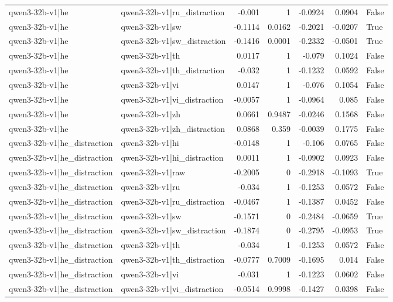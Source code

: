 \begin{table}
\begin{tabular}{l l r r r r l}
qwen3-32b-v1|he & qwen3-32b-v1|ru_distraction & -0.001 & 1 & -0.0924 & 0.0904 & False \\
qwen3-32b-v1|he & qwen3-32b-v1|sw & -0.1114 & 0.0162 & -0.2021 & -0.0207 & True \\
qwen3-32b-v1|he & qwen3-32b-v1|sw_distraction & -0.1416 & 0.0001 & -0.2332 & -0.0501 & True \\
qwen3-32b-v1|he & qwen3-32b-v1|th & 0.0117 & 1 & -0.079 & 0.1024 & False \\
qwen3-32b-v1|he & qwen3-32b-v1|th_distraction & -0.032 & 1 & -0.1232 & 0.0592 & False \\
qwen3-32b-v1|he & qwen3-32b-v1|vi & 0.0147 & 1 & -0.076 & 0.1054 & False \\
qwen3-32b-v1|he & qwen3-32b-v1|vi_distraction & -0.0057 & 1 & -0.0964 & 0.085 & False \\
qwen3-32b-v1|he & qwen3-32b-v1|zh & 0.0661 & 0.9487 & -0.0246 & 0.1568 & False \\
qwen3-32b-v1|he & qwen3-32b-v1|zh_distraction & 0.0868 & 0.359 & -0.0039 & 0.1775 & False \\
qwen3-32b-v1|he_distraction & qwen3-32b-v1|hi & -0.0148 & 1 & -0.106 & 0.0765 & False \\
qwen3-32b-v1|he_distraction & qwen3-32b-v1|hi_distraction & 0.0011 & 1 & -0.0902 & 0.0923 & False \\
qwen3-32b-v1|he_distraction & qwen3-32b-v1|raw & -0.2005 & 0 & -0.2918 & -0.1093 & True \\
qwen3-32b-v1|he_distraction & qwen3-32b-v1|ru & -0.034 & 1 & -0.1253 & 0.0572 & False \\
qwen3-32b-v1|he_distraction & qwen3-32b-v1|ru_distraction & -0.0467 & 1 & -0.1387 & 0.0452 & False \\
qwen3-32b-v1|he_distraction & qwen3-32b-v1|sw & -0.1571 & 0 & -0.2484 & -0.0659 & True \\
qwen3-32b-v1|he_distraction & qwen3-32b-v1|sw_distraction & -0.1874 & 0 & -0.2795 & -0.0953 & True \\
qwen3-32b-v1|he_distraction & qwen3-32b-v1|th & -0.034 & 1 & -0.1253 & 0.0572 & False \\
qwen3-32b-v1|he_distraction & qwen3-32b-v1|th_distraction & -0.0777 & 0.7009 & -0.1695 & 0.014 & False \\
qwen3-32b-v1|he_distraction & qwen3-32b-v1|vi & -0.031 & 1 & -0.1223 & 0.0602 & False \\
qwen3-32b-v1|he_distraction & qwen3-32b-v1|vi_distraction & -0.0514 & 0.9998 & -0.1427 & 0.0398 & False \\

\end{tabular}
\end{table}
